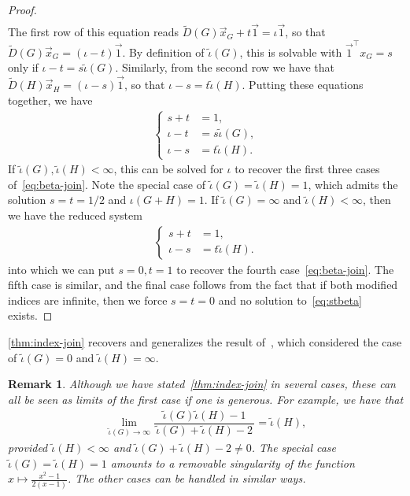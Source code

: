 \documentclass[11pt,a4paper]{article}
\newcommand{\x}{\vec{x}}
\newcommand{\one}{\vec{1}}
\newtheorem{remark}[theorem]{Remark}
\begin{document}
\begin{proof}
\begin{align*}
            \end{align*}
        The first row of this equation reads $\widetilde{D}(G)\x_G + t\one = \iota\one$, so that $\widetilde{D}(G)\x_G = (\iota - t)\one$. By definition of $\widetilde{\iota}(G)$, this is solvable with $\one^\top x_G = s$ only if $\iota - t = s\widetilde{\iota}(G)$. Similarly, from the second row we have that $\widetilde{D}(H)\x_H = (\iota - s)\one$, so that $\iota - s = t\widetilde{\iota}(H)$. Putting these equations together, we have
            \begin{align}\label{eq:stbeta}
                \begin{cases}
                    s+t &=1,\\
                    \iota - t &= s\widetilde{\iota}(G),\\
                    \iota - s &= t\widetilde{\iota}(H).
                \end{cases}
            \end{align}
        If $\widetilde{\iota}(G),\widetilde{\iota}(H)<\infty$, this can be solved for $\iota$ to recover the first three cases of~\cref{eq:beta-join}. Note the special case of $\widetilde{\iota}(G) = \widetilde{\iota}(H) = 1$, which admits the solution $s=t=1/2$ and $\iota(G+ H) = 1$. If $\widetilde{\iota}(G) = \infty$ and $\widetilde{\iota}(H) < \infty$, then we have the reduced system
            \begin{align*}
                \begin{cases}
                    s+t &=1,\\
                    \iota - s &= t\widetilde{\iota}(H).
                \end{cases}
            \end{align*}
        into which we can put $s=0, t=1$ to recover the fourth case~\cref{eq:beta-join}. The fifth case is similar, and the final case follows from the fact that if both modified indices are infinite, then we force $s=t=0$ and no solution to~\cref{eq:stbeta} exists.
    \end{proof}

    \cref{thm:index-join} recovers and generalizes the result of~\cite[Thm. 4]{dudarov2023image}, which considered the case of $\widetilde{\iota}(G) = 0$ and $\widetilde{\iota}(H) = \infty$.
    
    \begin{remark}
        Although we have stated~\cref{thm:index-join} in several cases, these can all be seen as limits of the first case if one is generous. For example, we have that
            \begin{align*}
                \lim_{\widetilde{\iota}(G) \to \infty}\dfrac{\widetilde{\iota}(G) \widetilde{\iota}(H)-1}{\,\widetilde{\iota}(G)+\widetilde{\iota}(H)-2\,} = \widetilde{\iota}(H),
            \end{align*}
        provided $\widetilde{\iota}(H)<\infty$ and $\widetilde{\iota}(G)+\widetilde{\iota}(H)-2\ne 0$. The special case $\widetilde{\iota}(G)=\widetilde{\iota}(H)=1$ amounts to a removable singularity of the function $x\mapsto \frac{x^2-1}{2(x-1)}$. The other cases can be handled in similar ways.
    \end{remark}
\end{document}
